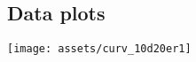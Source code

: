 \documentclass{article}
\begin{document}
\begin{multicols}{2}
\section{Data plots}

\begin{center}
\texttt{[image: assets/curv\_10d20er1]}
\end{center}


\end{multicols}
%
\end{document}
